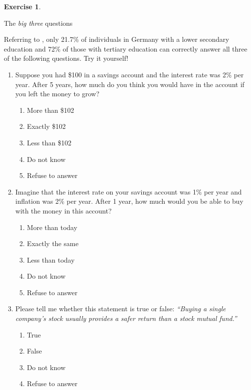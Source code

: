 \documentclass[
  12pt,
  oneside]{book}
\providecommand{\tightlist}{%
  \setlength{\itemsep}{0pt}\setlength{\parskip}{0pt}}
\theoremstyle{definition}
\theoremstyle{definition}
\theoremstyle{definition}
\newtheorem{exercise}{Exercise}[chapter]
\theoremstyle{definition}
\theoremstyle{remark}
\begin{document}
\begin{exercise}
\protect\hypertarget{exr:bigthreeiq}{}\label{exr:bigthreeiq}

The \emph{big three} questions

Referring to \citet{Mitchell2015Financial}, only 21.7\% of individuals in Germany with a lower secondary education and 72\% of those with tertiary education can correctly answer all three of the following questions. Try it yourself!

\begin{enumerate}
\def\labelenumi{\arabic{enumi}.}
\tightlist
\item
  Suppose you had \$100 in a savings account and the interest rate was 2\% per year. After 5 years, how much do you think you would have in the account if you left the money to grow?

  \begin{enumerate}
  \def\labelenumii{\alph{enumii})}
  \tightlist
  \item
    More than \$102
  \item
    Exactly \$102
  \item
    Less than \$102
  \item
    Do not know
  \item
    Refuse to answer
  \end{enumerate}
\item
  Imagine that the interest rate on your savings account was 1\% per year and inflation was 2\% per year. After 1 year, how much would you be able to buy with the money in this account?

  \begin{enumerate}
  \def\labelenumii{\alph{enumii})}
  \tightlist
  \item
    More than today
  \item
    Exactly the same
  \item
    Less than today
  \item
    Do not know
  \item
    Refuse to answer
  \end{enumerate}
\item
  Please tell me whether this statement is true or false: \emph{``Buying a single company's stock usually provides a safer return than a stock mutual fund.''}

  \begin{enumerate}
  \def\labelenumii{\alph{enumii})}
  \tightlist
  \item
    True
  \item
    False
  \item
    Do not know
  \item
    Refuse to answer
  \end{enumerate}
\end{enumerate}


\end{exercise}
\end{document}
